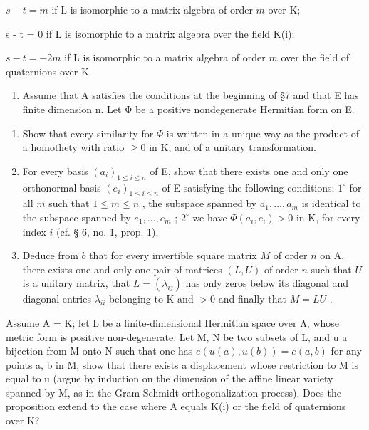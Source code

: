 \(s-t=m\) if L is isomorphic to a matrix algebra of order \(m\) over K;

s - t = 0 if L is isomorphic to a matrix algebra over the field K(i);

\(s - t = -2m\) if L is isomorphic to a matrix algebra of order \(m\) over the field of quaternions over K.

\begin{enumerate}
\def\labelenumi{\arabic{enumi})}
\setcounter{enumi}{6}
\tightlist
\item
  Assume that A satisfies the conditions at the beginning of §7 and that E has finite dimension n. Let Φ be a positive nondegenerate Hermitian form on E.
\end{enumerate}

\begin{enumerate}
\def\labelenumi{\alph{enumi})}
\item
  Show that every similarity for \(\Phi\) is written in a unique way as the product of a homothety with ratio \(\geqslant 0\) in K, and of a unitary transformation.
\item
  For every basis \((a_{i})_{1\leqslant i\leqslant n}\) of E, show that there exists one and only one orthonormal basis \((e_{i})_{1\leqslant i\leqslant n}\) of E satisfying the following conditions: \(1^{\circ}\) for all \(m\) such that \(1\leqslant m\leqslant n\) , the subspace spanned by \(a_1,\ldots ,a_m\) is identical to the subspace spanned by \(e_1,\ldots ,e_m\) ; \(2^{\circ}\) we have \(\Phi (a_i,e_i) > 0\) in K, for every index \(i\) (cf. § 6, no. 1, prop. 1).
\item
  Deduce from \(b\) that for every invertible square matrix \(M\) of order \(n\) on A, there exists one and only one pair of matrices \((L, U)\) of order \(n\) such that \(U\) is a unitary matrix, that \(L = (\lambda_{ij})\) has only zeros below its diagonal and diagonal entries \(\lambda_{ii}\) belonging to K and \(>0\) and finally that \(M = LU\) .
\end{enumerate}

Assume A = K; let L be a finite-dimensional Hermitian space over Λ, whose metric form is positive non-degenerate. Let M, N be two subsets of L, and u a bijection from M onto N such that one has \(e(u(a), u(b)) = e(a, b)\) for any points a, b in M, show that there exists a displacement whose restriction to M is equal to u (argue by induction on the dimension of the affine linear variety spanned by M, as in the Gram-Schmidt orthogonalization process). Does the proposition extend to the case where A equals K(i) or the field of quaternions over K?

